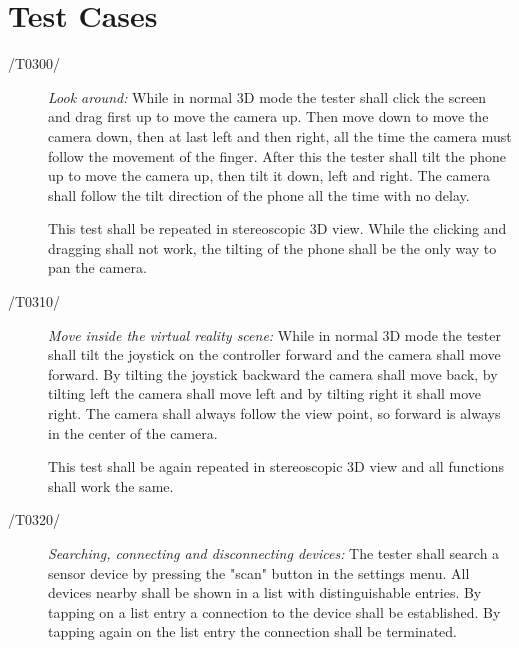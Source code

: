 \section{Test Cases}





\begin{description}
  \item[/T0300/]
    \textit{Look around:} While in normal 3D mode the tester shall click the screen and drag first up to move the camera up.
    Then move down to move the camera down, then at last left and then right, all the time the camera must follow the movement of the finger.
    After this the tester shall tilt the phone up to move the camera up, then tilt it down, left and right. The camera shall follow the tilt direction of the phone all the time with no delay.

    This test shall be repeated in stereoscopic 3D view. While the clicking and dragging shall not work, the tilting of the phone shall be the only way to pan the camera.
\end{description}

\begin{description}
  \item[/T0310/]
    \textit{Move inside the virtual reality scene:} While in normal 3D mode the tester shall tilt the joystick on the controller forward and the camera shall move forward.
    By tilting the joystick backward the camera shall move back, by tilting left the camera shall move left and by tilting right it shall move right.
    The camera shall always follow the view point, so forward is always in the center of the camera.

    This test shall be again repeated in stereoscopic 3D view and all functions shall work the same.
\end{description}

\begin{description}
	\item[/T0320/]
	\textit{Searching, connecting and disconnecting devices:} The tester shall search a sensor device by pressing the "scan" button in the settings menu. All devices nearby shall be shown in a list with distinguishable entries. By tapping on a list entry a connection to the device shall be established.
	By tapping again on the list entry the connection shall be terminated.
\end{description}


